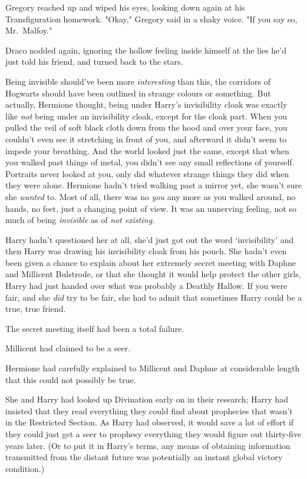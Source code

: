 Gregory reached up and wiped his eyes, looking down again at his
Transfiguration homework. "Okay," Gregory said in a shaky voice. "If you say
so, Mr.~Malfoy."

Draco nodded again, ignoring the hollow feeling inside himself at the lies he'd
just told his friend, and turned back to the stars.

Being invisible should've been more \emph{interesting} than this, the corridors
of Hogwarts should have been outlined in strange colours or something. But
actually, Hermione thought, being under Harry's invisibility cloak was exactly
like \emph{not} being under an invisibility cloak, except for the cloak part.
When you pulled the veil of soft black cloth down from the hood and over your
face, you couldn't even see it stretching in front of you, and afterward it
didn't seem to impede your breathing. And the world looked just the same,
except that when you walked past things of metal, you didn't see any small
reflections of yourself. Portraits never looked at you, only did whatever
strange things they did when they were alone. Hermione hadn't tried walking
past a mirror yet, she wasn't sure she \emph{wanted} to. Most of all, there was
no \emph{you} any more as you walked around, no hands, no feet, just a changing
point of view. It was an unnerving feeling, not so much of being
\emph{invisible} as of \emph{not existing.}

Harry hadn't questioned her at all, she'd just got out the word `invisibility'
and then Harry was drawing his invisibility cloak from his pouch. She hadn't
even been given a chance to explain about her extremely secret meeting with
Daphne and Millicent Bulstrode, or that she thought it would help protect the
other girls, Harry had just handed over what was probably a Deathly Hallow. If
you were fair, and she \emph{did} try to be fair, she had to admit that
sometimes Harry could be a true, true friend.

The secret meeting itself had been a total failure.

Millicent had claimed to be a seer.

Hermione had carefully explained to Millicent and Daphne at considerable length
that this could not possibly be true.

She and Harry had looked up Divination early on in their research; Harry had
insisted that they read everything they could find about prophecies that wasn't
in the Restricted Section. As Harry had observed, it would save a lot of effort
if they could just get a seer to prophesy everything they would figure out
thirty-five years later. (Or to put it in Harry's terms, any means of obtaining
information transmitted from the distant future was potentially an instant
global victory condition.)

